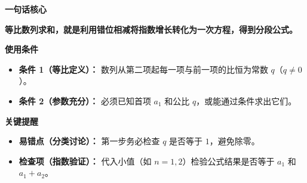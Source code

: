 \begin{summarybox}
\textbf{\textcolor{CSummary}{一句话核心}}

\textbf{等比数列求和，就是利用错位相减将指数增长转化为一次方程，得到分段公式。}

\medskip
\textbf{\textcolor{CSummary}{使用条件}}
\begin{itemize}[leftmargin=*, itemsep=0.5em, topsep=0.4em]
    \item \textbf{条件 1（等比定义）：} 数列从第二项起每一项与前一项的比恒为常数 $q$（$q\neq0$）。
    \item \textbf{条件 2（参数充分）：} 必须已知首项 $a_1$ 和公比 $q$，或能通过条件求出它们。
\end{itemize}

\medskip
\textbf{\textcolor{CSummary}{关键提醒}}
\begin{itemize}[leftmargin=*, itemsep=0.5em, topsep=0.4em]
    \item \textbf{易错点（分类讨论）：} 第一步务必检查 $q$ 是否等于 $1$，避免除零。
    \item \textbf{检查项（指数验证）：} 代入小值（如 $n=1,2$）检验公式结果是否等于 $a_1$ 和 $a_1+a_2$。
\end{itemize}
\end{summarybox}

